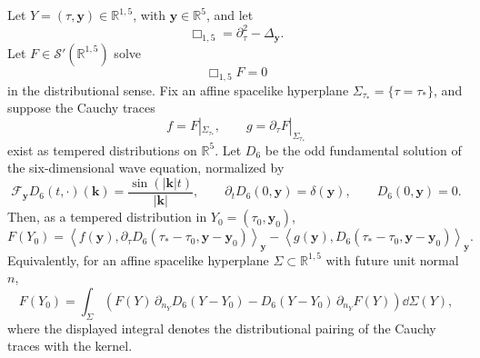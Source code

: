 \begin{lemma}
\label{lem:six-dimensional-distributional-cauchy-formula}
Let \(Y=(\tau,\mathbf y)\in\mathbb R^{1,5}\), with
\(\mathbf y\in\mathbb R^5\), and let
\[
  \Box_{1,5}=\partial_\tau^2-\Delta_{\mathbf y}.
\]
Let \(F\in\mathcal S'(\mathbb R^{1,5})\) solve
\[
  \Box_{1,5}F=0
\]
in the distributional sense.  Fix an affine spacelike hyperplane
\(\Sigma_{\tau_*}=\{\tau=\tau_*\}\), and suppose the Cauchy traces
\[
  f=F|_{\Sigma_{\tau_*}},
  \qquad
  g=\partial_\tau F|_{\Sigma_{\tau_*}}
\]
exist as tempered distributions on \(\mathbb R^5\).  Let \(D_6\) be the odd
fundamental solution of the six-dimensional wave equation, normalized by
\begin{equation}
  \mathcal F_{\mathbf y}D_6(t,\cdot)(\mathbf k)
  =
  \frac{\sin(|\mathbf k|t)}{|\mathbf k|},
  \qquad
  \partial_tD_6(0,\mathbf y)=\delta(\mathbf y),
  \qquad
  D_6(0,\mathbf y)=0 .
  \label{eq:six-dimensional-wave-commutator-kernel}
\end{equation}
Then, as a tempered distribution in \(Y_0=(\tau_0,\mathbf y_0)\),
\begin{equation}
  F(Y_0)
  =
  \left\langle
    f(\mathbf y),
    \partial_{\tau}D_6(\tau_*-\tau_0,\mathbf y-\mathbf y_0)
  \right\rangle_{\mathbf y}
  -
  \left\langle
    g(\mathbf y),
    D_6(\tau_*-\tau_0,\mathbf y-\mathbf y_0)
  \right\rangle_{\mathbf y}.
  \label{eq:six-dimensional-distributional-cauchy-formula}
\end{equation}
Equivalently, for an affine spacelike hyperplane
\(\Sigma\subset\mathbb R^{1,5}\) with future unit normal \(n\),
\begin{equation}
  F(Y_0)
  =
  \int_\Sigma
  \left(
    F(Y)\,\partial_{n_Y}D_6(Y-Y_0)
    -
    D_6(Y-Y_0)\,\partial_{n_Y}F(Y)
  \right)\dd\Sigma(Y),
  \label{eq:six-dimensional-geometric-cauchy-formula}
\end{equation}
where the displayed integral denotes the distributional pairing of the
Cauchy traces with the kernel.
\end{lemma}

